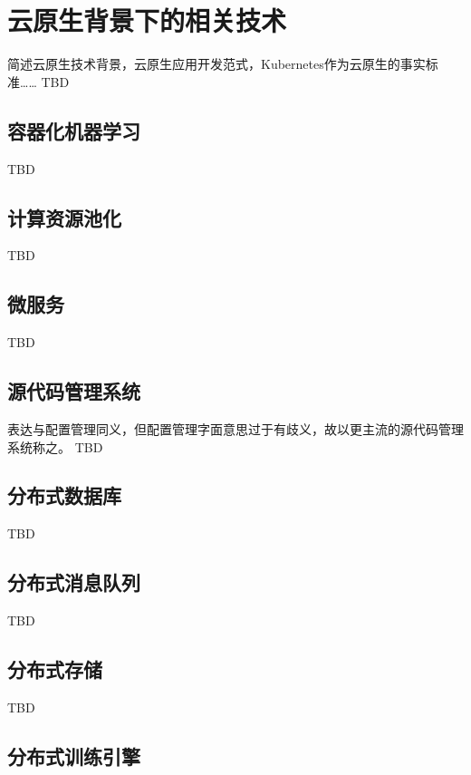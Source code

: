 
\chapter{云原生背景下的相关技术}

简述云原生技术背景，云原生应用开发范式，Kubernetes作为云原生的事实标准……
TBD


\section{容器化机器学习}

TBD


\section{计算资源池化}

TBD


\section{微服务}

TBD


\section{源代码管理系统}

表达与配置管理同义，但配置管理字面意思过于有歧义，故以更主流的源代码管理系统称之。
TBD


\section{分布式数据库}

TBD


\section{分布式消息队列}

TBD


\section{分布式存储}

TBD


\section{分布式训练引擎}

